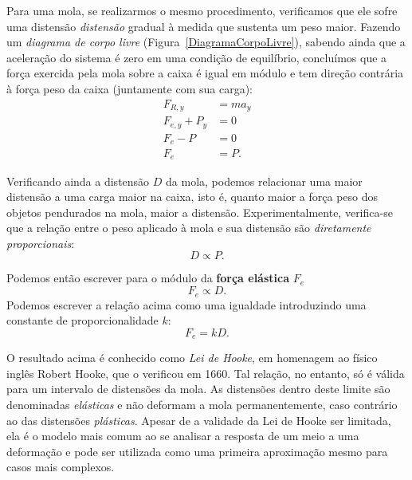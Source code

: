 Para uma mola, se realizarmos o mesmo procedimento, verificamos que ele sofre uma distensão \emph{distensão} gradual à medida que sustenta um peso maior. Fazendo um \emph{diagrama de corpo livre} (Figura~\ref{DiagramaCorpoLivre}), sabendo ainda que a aceleração do sistema é zero em uma condição de equilíbrio, concluímos que a força exercida pela mola sobre a caixa é igual em módulo e tem direção contrária à força peso da caixa (juntamente com sua carga):
\begin{align}
    F_{R, y} &= ma_y \\
    F_{e,y} + P_y &= 0 \\
    F_e - P &= 0 \\
	F_e &= P.
\end{align}

Verificando ainda a distensão $D$ da mola, podemos relacionar uma maior distensão a uma carga maior na caixa, isto é, quanto maior a força peso dos objetos pendurados na mola, maior a distensão. Experimentalmente, verifica-se que a relação entre o peso aplicado à mola e sua distensão são \emph{diretamente proporcionais}:
\begin{equation}
	D \propto P.
\end{equation}

Podemos então escrever para o módulo da \textbf{força elástica} $F_e$
\begin{equation}
	F_e \propto D.
\end{equation}
%
Podemos escrever a relação acima como uma igualdade introduzindo uma constante de proporcionalidade $k$:
\begin{equation}\label{Eq:LeiDeHookeEmModulo}
	F_e = k D.
\end{equation}

O resultado acima é conhecido como \emph{Lei de Hooke}, em homenagem ao físico inglês Robert Hooke, que o verificou em 1660. Tal relação, no entanto, só é válida para um intervalo de distensões da mola. As distensões dentro deste limite são denominadas \emph{elásticas} e não deformam a mola permanentemente, caso contrário ao das distensões \emph{plásticas}. Apesar de a validade da Lei de Hooke ser limitada, ela é o modelo mais comum ao se analisar a resposta de um meio a uma deformação e pode ser utilizada como uma primeira aproximação mesmo para casos mais complexos.

